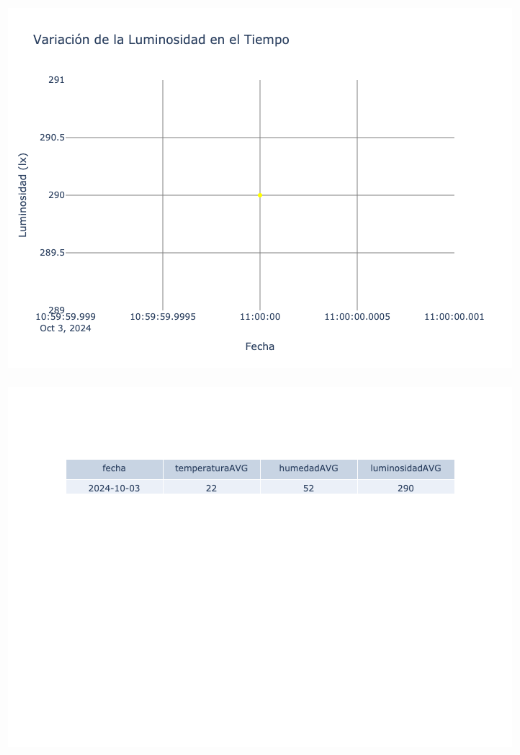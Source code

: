 \documentclass{article}
\begin{document}
    \noindent
    \begin{minipage}{0.48\textwidth}
        \centering
        \includegraphics[width=\textwidth]{../img/poli/LS201-90Dias-03-12-2024.png}
    \end{minipage}
    \hfill
    \begin{minipage}{0.48\textwidth}
        \centering
        \includegraphics[width=\textwidth]{../img/tables/CAVG201-90Dias-03-12-2024.png}
    \end{minipage}
    
\end{document}

